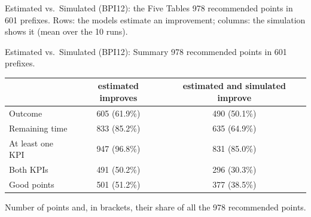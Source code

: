 \documentclass[aspectratio=169]{beamer} %
\begin{document}
\begin{frame}{Estimated vs.\ Simulated (BPI12): the Five Tables}
  \footnotesize
  978 recommended points in 601 prefixes. Rows: the models estimate an improvement; columns: the
  simulation shows it (mean over the 10 runs).
  \par\vspace{0.3cm}\noindent
  \hfill
  \hfill
  \par\vspace{0.5cm}\noindent\hspace*{\fill}%
  \hspace{0.08\textwidth}%
  \hspace*{\fill}
\end{frame}

\begin{frame}{Estimated vs.\ Simulated (BPI12): Summary}
  \footnotesize\setlength{\aboverulesep}{0pt}\setlength{\belowrulesep}{1pt}
  978 recommended points in 601 prefixes.
  \begin{center}\setlength{\tabcolsep}{6pt}
  \begin{tabular}{lcc}
    \toprule
     & estimated improves & estimated and simulated improve \\
    \midrule
    Outcome & 605 (61.9\%) & 490 (50.1\%) \\
    Remaining time & 833 (85.2\%) & 635 (64.9\%) \\
    At least one KPI & 947 (96.8\%) & 831 (85.0\%) \\
    Both KPIs & 491 (50.2\%) & 296 (30.3\%) \\
    Good points & 501 (51.2\%) & 377 (38.5\%) \\
    \bottomrule
  \end{tabular}
  \end{center}
  {\scriptsize Number of points and, in brackets, their share of all the 978 recommended points.}
\end{frame}
\end{document}
